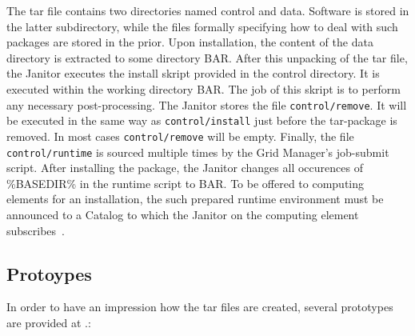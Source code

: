 The tar file contains two directories named control and data. Software is stored in the latter subdirectory,
while the files formally specifying how to deal with such packages are stored in the prior. Upon installation,
the content of the data directory is extracted to some directory \textdollar BAR. 
After this unpacking of the tar file, the Janitor executes the install skript provided in the control directory. 
It is executed within the working directory \textdollar BAR. The job of this skript is to perform any necessary post-processing.
The Janitor stores the file \texttt{control/remove}. It will be executed in the same way as \texttt{control/install} just
before the tar-package is removed. In most cases \texttt{control/remove} will be empty.
Finally, the file \texttt{control/runtime} is sourced multiple times by the Grid Manager's job-submit script. After
installing the package, the Janitor changes all occurences of \%BASEDIR\% in the runtime script to \textdollar BAR.
To be offered to computing elements for an installation, the such prepared runtime environment must be
announced to a Catalog to which the Janitor on the computing element subscribes~\cite[p. 10]{BAYER_2007}.



\subsection{Protoypes}

In order to have an impression how the tar files are created, several prototypes are provided at .:\\


